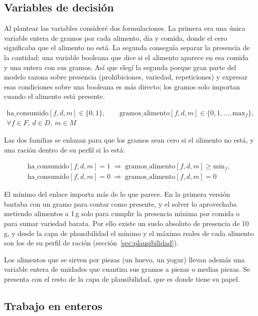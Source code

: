 \subsection{Variables de decisión}

Al plantear las variables consideré dos formulaciones. La primera era una única variable entera de gramos por cada alimento, día y comida, donde el cero significaba que el alimento no está. La segunda conseguía separar la presencia de la cantidad: una variable booleana que dice si el alimento aparece en esa comida y una entera con sus gramos. Así que elegí la segunda porque gran parte del modelo razona sobre presencia (prohibiciones, variedad, repeticiones) y expresar esas condiciones sobre una booleana es más directo; los gramos solo importan cuando el alimento está presente.

\begin{gather*}
\text{ha\_consumido}[f,d,m] \in \{0, 1\}, \qquad \text{gramos\_alimento}[f,d,m] \in \{0, 1, \dots, \text{max}_f\}, \\
\forall f \in F,\ d \in D,\ m \in M
\end{gather*}

Las dos familias se enlazan para que los gramos sean cero si el alimento no está, y una ración dentro de su perfil si lo está:

\begin{gather*}
\text{ha\_consumido}[f,d,m] = 1 \;\Rightarrow\; \text{gramos\_alimento}[f,d,m] \ge \text{min}_f, \\
\text{ha\_consumido}[f,d,m] = 0 \;\Rightarrow\; \text{gramos\_alimento}[f,d,m] = 0
\end{gather*}

El mínimo del enlace importa más de lo que parece. En la primera versión bastaba con un gramo para contar como presente, y el solver lo aprovechaba metiendo alimentos a 1\,g solo para cumplir la presencia mínima por comida o para sumar variedad barata. Por ello existe un suelo absoluto de presencia de 10\,g, y desde la capa de plausibilidad el mínimo y el máximo reales de cada alimento son los de su perfil de ración (sección~\ref{sec:plausibilidad}).

Los alimentos que se sirven por piezas (un huevo, un yogur) llevan además una variable entera de unidades que cuantiza sus gramos a piezas o medias piezas. Se presenta con el resto de la capa de plausibilidad, que es donde tiene su papel.

\subsection{Trabajo en enteros}

